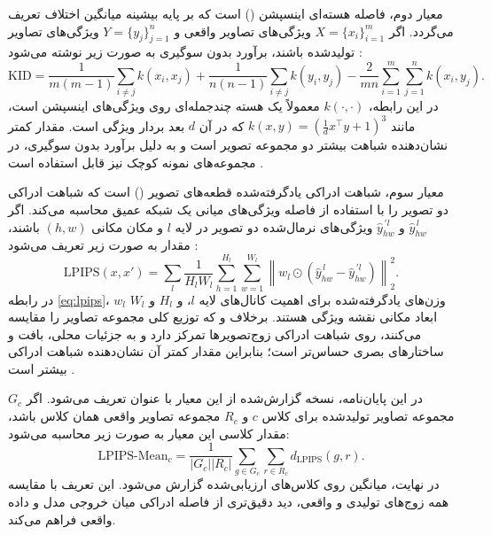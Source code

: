 معیار دوم، فاصله هسته‌ای اینسپشن () است که بر پایه بیشینه میانگین اختلاف تعریف می‌گردد. اگر $X=\{x_i\}_{i=1}^{m}$ ویژگی‌های تصاویر واقعی و $Y=\{y_j\}_{j=1}^{n}$ ویژگی‌های تصاویر تولیدشده باشند، برآورد بدون سوگیری  به صورت زیر نوشته می‌شود \cite{binkowski2018kid}:
\begin{equation}
    \label{eq:kid}
    \mathrm{KID} =
    \frac{1}{m(m-1)}\sum_{i \ne j} k(x_i,x_j)
    + \frac{1}{n(n-1)}\sum_{i \ne j} k(y_i,y_j)
    - \frac{2}{mn}\sum_{i=1}^{m}\sum_{j=1}^{n} k(x_i,y_j).
\end{equation}
در این رابطه، $k(\cdot,\cdot)$ معمولاً یک هسته چندجمله‌ای روی ویژگی‌های اینسپشن است، مانند $k(x,y) = (\frac{1}{d}x^\top y + 1)^3$ که در آن $d$ بعد بردار ویژگی است. مقدار کمتر  نشان‌دهنده شباهت بیشتر دو مجموعه تصویر است و به دلیل برآورد بدون سوگیری، در مجموعه‌های نمونه کوچک نیز قابل استفاده است \cite{binkowski2018kid}.

معیار سوم، شباهت ادراکی یادگرفته‌شده قطعه‌های تصویر () است که شباهت ادراکی دو تصویر را با استفاده از فاصله ویژگی‌های میانی یک شبکه عمیق محاسبه می‌کند. اگر $\hat{y}^{\,l}_{hw}$ و $\hat{y}^{\,\prime l}_{hw}$ ویژگی‌های نرمال‌شده دو تصویر در لایه $l$ و مکان مکانی $(h,w)$ باشند، مقدار  به صورت زیر تعریف می‌شود \cite{zhang2018lpips}:
\begin{equation}
    \label{eq:lpips}
    \mathrm{LPIPS}(x,x') =
    \sum_l \frac{1}{H_l W_l}
    \sum_{h=1}^{H_l}\sum_{w=1}^{W_l}
    \left\| w_l \odot \left(\hat{y}^{\,l}_{hw} - \hat{y}^{\,\prime l}_{hw}\right) \right\|_2^2.
\end{equation}
در رابطه \ref{eq:lpips}، $w_l$ وزن‌های یادگرفته‌شده برای اهمیت کانال‌های لایه $l$، و $H_l$ و $W_l$ ابعاد مکانی نقشه ویژگی هستند. برخلاف  و  که توزیع کلی مجموعه تصاویر را مقایسه می‌کنند،  روی شباهت ادراکی زوج‌تصویرها تمرکز دارد و به جزئیات محلی، بافت و ساختارهای بصری حساس‌تر است؛ بنابراین مقدار کمتر آن نشان‌دهنده شباهت ادراکی بیشتر است \cite{zhang2018lpips}.

در این پایان‌نامه، نسخه گزارش‌شده از این معیار با عنوان  تعریف می‌شود. اگر $G_c$ مجموعه تصاویر تولیدشده برای کلاس $c$ و $R_c$ مجموعه تصاویر واقعی همان کلاس باشد، مقدار کلاسی این معیار به صورت زیر محاسبه می‌شود:
\begin{equation}
    \label{eq:lpips-mean}
    \mathrm{LPIPS\text{-}Mean}_c =
    \frac{1}{|G_c||R_c|}
    \sum_{g \in G_c}\sum_{r \in R_c}
    d_{\mathrm{LPIPS}}(g,r).
\end{equation}
در نهایت، میانگین  روی کلاس‌های ارزیابی‌شده گزارش می‌شود. این تعریف با مقایسه همه زوج‌های تولیدی و واقعی، دید دقیق‌تری از فاصله ادراکی میان خروجی مدل و داده واقعی فراهم می‌کند.
